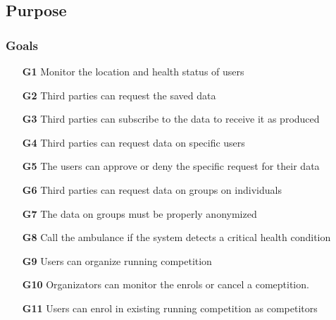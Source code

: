 \subsection{Purpose}
\subsubsection{Goals}
\begin{itemize}
\item
[\textbf{G1}] Monitor the location and health status of users 
\item
[\textbf{G2}] Third parties can request the saved data 
\item
[\textbf{G3}] Third parties can subscribe to the data to receive it as produced 
\item
[\textbf{G4}] Third parties can request data on specific users 
\item
[\textbf{G5}] The users can approve or deny the specific request for their data 
\item
[\textbf{G6}] Third parties can request data on groups on individuals 
\item
[\textbf{G7}] The data on groups must be properly anonymized 
\item
[\textbf{G8}] Call the ambulance if the system detects a critical health condition 
\item
[\textbf{G9}] Users can organize running competition 
\item
[\textbf{G10}] Organizators can monitor the enrols or cancel a comeptition. 
\item
[\textbf{G11}] Users can enrol in existing running competition as competitors
\end{itemize}


